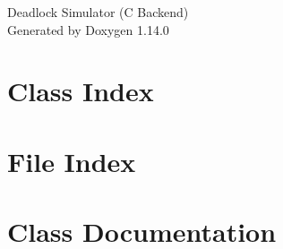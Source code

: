 \documentclass[twoside]{book}
\newcommand{\+}{\discretionary{\mbox{\scriptsize$\hookleftarrow$}}{}{}}
\newcommand{\clearemptydoublepage}{%
    \newpage{\pagestyle{empty}\cleardoublepage}%
  }
\begin{document}
  \raggedbottom
    \hypersetup{pageanchor=false,
                bookmarksnumbered=true,
                pdfencoding=unicode
               }
  \begin{titlepage}
  \vspace*{7cm}
  \begin{center}%
  {\Large Deadlock Simulator (\+C Backend)}\\
  \vspace*{1cm}
  {\large Generated by Doxygen 1.14.0}\\
  \end{center}
  \end{titlepage}
  \clearemptydoublepage
  \tableofcontents
  \clearemptydoublepage
  \hypersetup{pageanchor=true}
\chapter{Class Index}

\chapter{File Index}

\chapter{Class Documentation}











\end{document}
